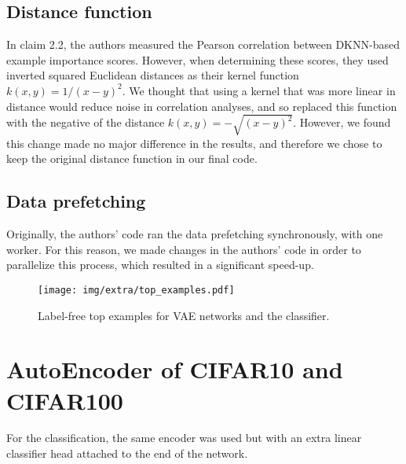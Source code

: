 \subsection{Distance function}

In claim 2.2, the authors measured the Pearson correlation between DKNN-based example importance scores. However, when determining these scores, they used inverted squared Euclidean distances as their kernel function $k(x, y) = 1/(x-y)^2$. We thought that using a kernel that was more linear in distance would reduce noise in correlation analyses, and so replaced this function with the negative of the distance $k(x, y) = -\sqrt{(x-y)^2}$.  However, we found this change made no major difference in the results, and therefore we chose to keep the original distance function in our final code.

\subsection{Data prefetching}

Originally, the authors' code ran the data prefetching synchronously, with one worker. For this reason, we made changes in the authors' code in order to parallelize this process, which resulted in a significant speed-up.


\begin{figure}[]
    \begin{center}
    \texttt{[image: img/extra/top\_examples.pdf]}   
    \end{center}
    \caption{Label-free top examples for VAE networks and the classifier.}
    \label{fig:topexamples}
\end{figure}

\newpage

\section{AutoEncoder of CIFAR10 and CIFAR100}
\label{sec:autoencoderarch}

For the classification, the same encoder was used but with an extra linear classifier head attached to the end of the network.



